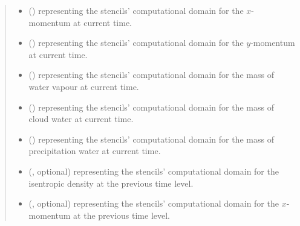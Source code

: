 \documentclass[letterpaper,10pt,english]{sphinxmanual}
\begin{document}
\begin{fulllineitems}
\begin{fulllineitems}
\begin{quote}
\begin{description}
\begin{itemize}
\item {} 
 () \textendash{}  representing the stencils’ computational domain for the \(x\)-momentum
at current time.

\item {} 
 () \textendash{}  representing the stencils’ computational domain for the \(y\)-momentum
at current time.

\item {} 
 () \textendash{}  representing the stencils’ computational domain for the mass of water vapour
at current time.

\item {} 
 () \textendash{}  representing the stencils’ computational domain for the mass of cloud water
at current time.

\item {} 
 () \textendash{}  representing the stencils’ computational domain for the mass of precipitation water
at current time.

\item {} 
 (, optional) \textendash{}  representing the stencils’ computational domain for the isentropic density
at the previous time level.

\item {} 
 (, optional) \textendash{}  representing the stencils’ computational domain for the \(x\)-momentum
at the previous time level.


\end{itemize}
\end{description}
\end{quote}
\end{fulllineitems}
\end{fulllineitems}
\end{document}
